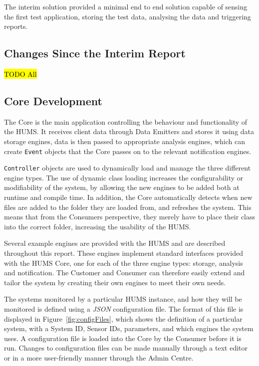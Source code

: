 \documentclass[10pt,a4paper]{article}
\begin{document}
The interim solution provided a minimal end to end solution capable of sensing the first test application, storing the test data, analysing the data and triggering reports. 

\subsection{Changes Since the Interim Report}
\label{sec:changes}
\hl{TODO All}

\subsection{Core Development}
\label{sec:core}

The Core is the main application controlling the behaviour and functionality of the HUMS. It receives client data through Data Emitters and stores it using data storage engines, data is then passed to appropriate analysis engines, which can create \texttt{Event} objects that the Core passes on to the relevant notification engines.

\texttt{Controller} objects are used to dynamically load and manage the three different engine types. The use of dynamic class loading increases the configurability or modifiability of the system, by allowing the new engines to be added both at runtime and compile time. In addition, the Core automatically detects when new files are added to the folder they are loaded from, and refreshes the system. This means that from the Consumers perspective, they merely have to place their class into the correct folder, increasing the usability of the HUMS. 

Several example engines are provided with the HUMS and are described throughout this report. These engines implement standard interfaces provided with the HUMS Core, one for each of the three engine types: storage, analysis and notification. The Customer and Consumer can therefore easily extend and tailor the system by creating their own engines to meet their own needs.

The systems monitored by a particular HUMS instance, and how they will be monitored is defined using a \emph{JSON} configuration file.
The format of this file is displayed in Figure~\ref{fig:configFiles}, which shows the definition of a particular system, with a System ID, Sensor IDs, parameters, and which engines the system uses.
A configuration file is loaded into the Core by the Consumer before it is run. Changes to configuration files can be made manually through a text editor or in a more user-friendly manner through the Admin Centre.
\end{document}
